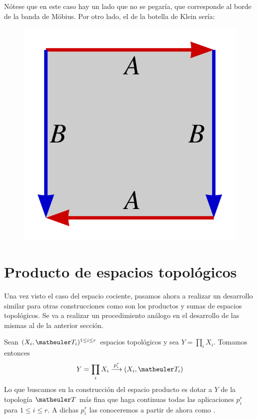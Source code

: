 \begin{exa}
\begin{enumerate}
		Nótese que en este caso hay un lado que no se pegaría, que corresponde al borde de la banda de Möbius. 
		\newpage
		Por otro lado, el de la botella de Klein sería:
		\begin{figure}[h!]
			\centering
			\includegraphics[scale = 0.1]{img/pol_fund_botella_klein}
		\end{figure}
	\end{enumerate}
\end{exa}

\section{Producto de espacios topológicos}
Una vez visto el caso del espacio cociente, pasamos ahora a realizar un desarrollo similar para otras construcciones como son los productos y sumas de espacios topológicos. Se va a realizar un procedimiento análogo en el desarrollo de las mismas al de la anterior sección.

Sean $(X_{i },\T_{i})^{1\le i\le r}$ espacios topológicos y sea $Y=\prod_i X_i$. Tomamos entonces 
\begin{equation}
Y=\prod_i X_i \stackrel{p_i^r}{\longrightarrow}(X_i,\T_i)
\end{equation}
Lo que buscamos en la construcción del espacio producto es dotar a $Y$ de la topología $\T$ más fina que haga continuas todas las aplicaciones $p_i^r$ para $1\le i\le r$. A dichas  $p_i^r$ las conoceremos a partir de ahora como .

